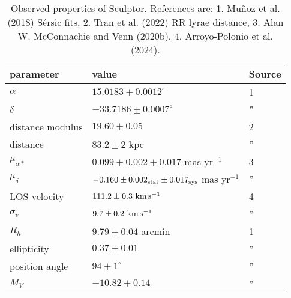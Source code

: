 \begin{table*}[t]
\centering
\caption[Observed Properties of Sculptor]{Observed properties of Sculptor. References are: 1. Muñoz et al. (2018) Sérsic fits, 2. Tran et al. (2022) RR lyrae distance, 3. Alan W. McConnachie and Venn (2020b), 4. Arroyo-Polonio et al. (2024). }
\label{tbl:scl_obs_props}
\begin{tabular}{lll}
\toprule
parameter & value & Source\\
\midrule
$\alpha$ & $15.0183 \pm 0.0012^\circ$ & 1\\
$\delta$ & $-33.7186 \pm 0.0007^\circ$ & ”\\
distance modulus & $19.60 \pm 0.05$ & 2\\
distance & $83.2 \pm 2$ kpc & ”\\
$\mu_{\alpha*}$ & $0.099 \pm 0.002 \pm 0.017$ mas yr$^{-1}$ & 3\\
$\mu_\delta$ & $-0.160 \pm 0.002_{\rm stat} \pm 0.017_{\rm sys}$ mas yr$^{-1}$ & ”\\
LOS velocity & $111.2 \pm 0.3\ {\rm km\,s^{-1}}$ & 4\\
$\sigma_v$ & $9.7\pm0.2\ {\rm km\,s^{-1}}$ & ”\\
$R_h$ & $9.79 \pm 0.04$ arcmin & 1\\
ellipticity & $0.37 \pm 0.01$ & ”\\
position angle & $94\pm1^\circ$ & ”\\
$M_V$ & $-10.82\pm0.14$ & ”\\
\bottomrule
\end{tabular}
\end{table*}

